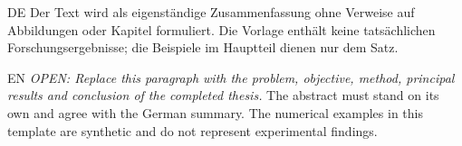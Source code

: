 \begin{Abstract}{DE}
Der Text wird als eigenständige Zusammenfassung ohne Verweise auf
Abbildungen oder Kapitel formuliert. Die Vorlage enthält keine tatsächlichen
Forschungsergebnisse; die Beispiele im Hauptteil dienen nur dem Satz.
\end{Abstract}

\begin{Abstract}{EN}
\textit{OPEN: Replace this paragraph with the problem, objective, method,
principal results and conclusion of the completed thesis.}
The abstract must stand on its own and agree with the German summary.
The numerical examples in this template are synthetic and do not represent
experimental findings.
\end{Abstract}

